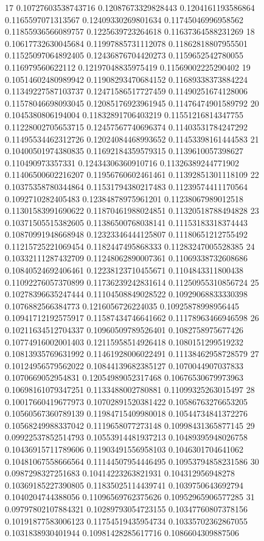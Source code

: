 17 0.10727603538743716 0.12087673329828443 0.1204161193586864 0.1165597071313567 0.12409330269801634 0.11745046996958562 0.11855936566089757 0.1225639723264618 0.11637364588231269
18 0.10617732630045684 0.11997885731112078 0.11862818807955501 0.11525097064892405 0.12436876704420273 0.1159652542780055 0.116979560622112 0.12197048835975419 0.11569002225290402
19 0.10514602480989942 0.11908293470684152 0.11689338373884224 0.11349227587103737 0.12471586517727459 0.11490251674128006 0.11578046698093045 0.12085176923961945 0.11476474901589792
20 0.1045380806194004 0.11832891706403219 0.11551216814347755 0.11228002705653715 0.12457567740696374 0.11403531784247292 0.11495534462312726 0.12024084468993652 0.11453398161444583
21 0.10400501974380835 0.11692184359579315 0.1139610057398627 0.110490973357331 0.12434306360910716 0.11326389244771902 0.11406500602216207 0.11956760602461461 0.11392851301118109
22 0.10375358780344864 0.11531794380217483 0.11239574411170564 0.1092710282405483 0.12384878975961201 0.11238067989012518 0.11301583991690622 0.11870461988024851 0.11320518788494828
23 0.10371505515382605 0.11386500768038141 0.11153183318374443 0.10870991948668948 0.12323346444125807 0.11180651212755492 0.11215725221069454 0.1182447495868333 0.11283247005528385
24 0.10332111287432709 0.11248062890007361 0.11069338732608686 0.10840524692406461 0.12238123710455671 0.1104843311800438 0.11092276057370899 0.11736239242831614 0.11250955310856724
25 0.10278396635247444 0.11104508849028522 0.10929068833330398 0.1076882566384773 0.1216056726224035 0.10925878998956445 0.10941712192575917 0.11587434746641662 0.11178963466946598
26 0.10211634512704337 0.10960509789526401 0.1082758975677426 0.10774916002001403 0.12115958514926418 0.1080151299519232 0.10813935769631992 0.11461928006022491 0.11138462958728579
27 0.10124956579562022 0.10844139682385127 0.1070044907037833 0.1070669052954831 0.12054989052317468 0.10676530679973963 0.10698161079347251 0.1133488002780881 0.11099325263015497
28 0.10017660419677973 0.10702891520381422 0.10586763276653205 0.10560567360789139 0.11984715409980018 0.10544734841372276 0.10568249988337042 0.1119658077273148 0.10998431365877145
29 0.09922537852514793 0.10553914481937213 0.10489395948026758 0.10436915711789606 0.11903491556958103 0.1046301704641062 0.10481067558666564 0.11144507954446495 0.10953794858231586
30 0.0987298327251683 0.10414223263821931 0.104312956948278 0.10369185227390805 0.11835025114439741 0.1039750643692794 0.1040204744388056 0.11096569762375626 0.10952965906577285
31 0.09797802107884321 0.10289793054723155 0.10347760807378156 0.10191877583006123 0.11754519435954734 0.10335702362867055 0.1031838930401944 0.10981428285617716 0.1086604309887506
